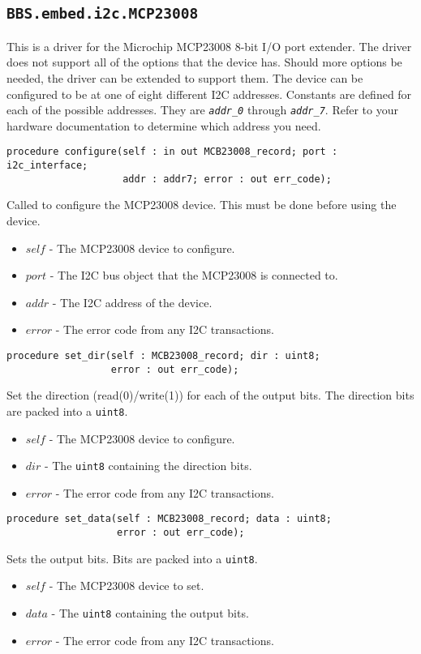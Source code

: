 \documentclass[10pt, openany]{book}
\newcommand{\package}[1]{\texttt{#1}}
\newcommand{\constant}[1]{\emph{\texttt{#1}}}
\newcommand{\datatype}[1]{\texttt{#1}}
\begin{document}
\subsection{\package{BBS.embed.i2c.MCP23008}}
This is a driver for the Microchip MCP23008 8-bit I/O port extender\cite{MCP23008}.  The driver does not support all of the options that the device has.  Should more options be needed, the driver can be extended to support them.  The device can be configured to be at one of eight different I2C addresses.  Constants are defined for each of the possible addresses.  They are \constant{addr\_0} through \constant{addr\_7}.  Refer to your hardware documentation to determine which address you need.

\begin{lstlisting}
procedure configure(self : in out MCB23008_record; port : i2c_interface;
                    addr : addr7; error : out err_code);
\end{lstlisting}
Called to configure the MCP23008 device.  This must be done before using the device.
\begin{itemize}
  \item $self$ - The MCP23008 device to configure.
  \item $port$ - The I2C bus object that the MCP23008 is connected to.
  \item $addr$ - The I2C address of the device.
  \item $error$ - The error code from any I2C transactions.
\end{itemize}

\begin{lstlisting}
procedure set_dir(self : MCB23008_record; dir : uint8;
                  error : out err_code);
\end{lstlisting}
Set the direction (read(0)/write(1)) for each of the output bits.  The direction bits are packed into a \datatype{uint8}.
\begin{itemize}
  \item $self$ - The MCP23008 device to configure.
  \item $dir$ - The \datatype{uint8} containing the direction bits.
  \item $error$ - The error code from any I2C transactions.
\end{itemize}

\begin{lstlisting}
procedure set_data(self : MCB23008_record; data : uint8;
                   error : out err_code);
\end{lstlisting}
Sets the output bits.  Bits are packed into a \datatype{uint8}.
\begin{itemize}
  \item $self$ - The MCP23008 device to set.
  \item $data$ - The \datatype{uint8} containing the output bits.
  \item $error$ - The error code from any I2C transactions.
\end{itemize}
\end{document}
